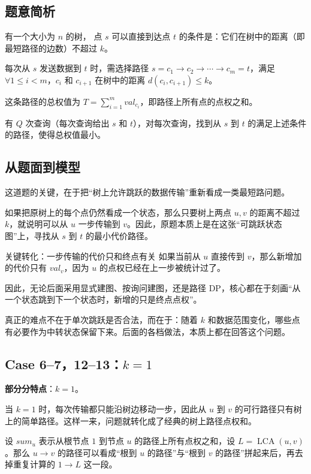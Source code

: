 \documentclass{book}
\begin{document}
    
    \subsection{题意简析}
有一个大小为 $n$ 的树，
点 $s$ 可以直接到达点 $t$ 的条件是：它们在树中的距离（即最短路径的边数）不超过 $k$。

每次从 $s$ 发送数据到 $t$ 时，需选择路径 $s = c_1 \rightarrow c_2 \rightarrow \cdots \rightarrow c_m = t$，满足 $\forall 1 \le i < m$，$c_i$ 和 $c_{i+1}$ 在树中的距离 $d(c_i, c_{i+1}) \le k$。
  
这条路径的总权值为 $T = \sum_{i=1}^{m} val_{c_i}$，即路径上所有点的点权之和。

有 $Q$ 次查询（每次查询给出 $s$ 和 $t$），对每次查询，找到从 $s$ 到 $t$ 的满足上述条件的路径，使得总权值最小。

\subsection{从题面到模型}

这道题的关键，在于把“树上允许跳跃的数据传输”重新看成一类最短路问题。

如果把原树上的每个点仍然看成一个状态，那么只要树上两点 $u,v$ 的距离不超过 $k$，就说明可以从 $u$ 一步传输到 $v$。因此，原题本质上是在这张“可跳跃状态图”上，寻找从 $s$ 到 $t$ 的最小代价路径。

\begin{keybox}{关键转化：一步传输的代价只和终点有关}
如果当前从 $u$ 直接传到 $v$，那么新增加的代价只有 $val_v$，因为 $u$ 的点权已经在上一步被统计过了。

因此，无论后面采用显式建图、按询问建图，还是路径 DP，核心都在于刻画“从一个状态跳到下一个状态时，新增的只是终点点权”。
\end{keybox}

真正的难点不在于单次跳跃是否合法，而在于：随着 $k$ 和数据范围变化，哪些点有必要作为中转状态保留下来。后面的各档做法，本质上都在回答这个问题。

\newpage
    \subsection{Case 6--7，12--13：\texorpdfstring{$k=1$}{k=1}}
    \textbf{部分分特点}：$k=1$。

    当 $k=1$ 时，每次传输都只能沿树边移动一步，因此从 $u$ 到 $v$ 的可行路径只有树上的简单路径。这样一来，问题就转化成了经典的树上路径点权和。
    
    设 $sum_u$ 表示从根节点 $1$ 到节点 $u$ 的路径上所有点权之和，设 $L=\operatorname{LCA}(u,v)$。那么 $u\rightarrow v$ 的路径可以看成“根到 $u$ 的路径”与“根到 $v$ 的路径”拼起来后，再去掉重复计算的 $1\rightarrow L$ 这一段。
\end{document}
